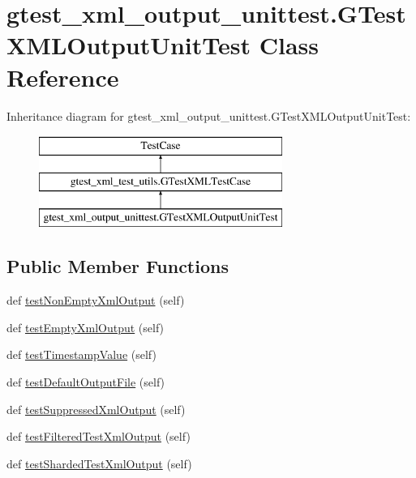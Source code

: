 \hypertarget{classgtest__xml__output__unittest_1_1_g_test_x_m_l_output_unit_test}{}\section{gtest\+\_\+xml\+\_\+output\+\_\+unittest.\+G\+Test\+X\+M\+L\+Output\+Unit\+Test Class Reference}
\label{classgtest__xml__output__unittest_1_1_g_test_x_m_l_output_unit_test}
Inheritance diagram for gtest\+\_\+xml\+\_\+output\+\_\+unittest.\+G\+Test\+X\+M\+L\+Output\+Unit\+Test\+:\begin{figure}[H]
\begin{center}
\leavevmode
\includegraphics[height=3.000000cm]{classgtest__xml__output__unittest_1_1_g_test_x_m_l_output_unit_test}
\end{center}
\end{figure}
\subsection*{Public Member Functions}
\begin{DoxyCompactItemize}
\item 
def \mbox{\hyperlink{classgtest__xml__output__unittest_1_1_g_test_x_m_l_output_unit_test_a310c136c1eb2b421f57651a7d358b17a}{test\+Non\+Empty\+Xml\+Output}} (self)
\item 
def \mbox{\hyperlink{classgtest__xml__output__unittest_1_1_g_test_x_m_l_output_unit_test_a9602f91fe2e9d1e09171a032e94a5619}{test\+Empty\+Xml\+Output}} (self)
\item 
def \mbox{\hyperlink{classgtest__xml__output__unittest_1_1_g_test_x_m_l_output_unit_test_a828521a7ae57f650e1e9ca4beb34336a}{test\+Timestamp\+Value}} (self)
\item 
def \mbox{\hyperlink{classgtest__xml__output__unittest_1_1_g_test_x_m_l_output_unit_test_a01ca66e14468028e5c4eb809987113cf}{test\+Default\+Output\+File}} (self)
\item 
def \mbox{\hyperlink{classgtest__xml__output__unittest_1_1_g_test_x_m_l_output_unit_test_ac6df46d6831892e4c14dbdfae0049618}{test\+Suppressed\+Xml\+Output}} (self)
\item 
def \mbox{\hyperlink{classgtest__xml__output__unittest_1_1_g_test_x_m_l_output_unit_test_a572b6d49e8f4d646ebdadcced3d260ef}{test\+Filtered\+Test\+Xml\+Output}} (self)
\item 
def \mbox{\hyperlink{classgtest__xml__output__unittest_1_1_g_test_x_m_l_output_unit_test_adc6a611bd7c433ecd84876dcb2ac1df1}{test\+Sharded\+Test\+Xml\+Output}} (self)
\end{DoxyCompactItemize}
